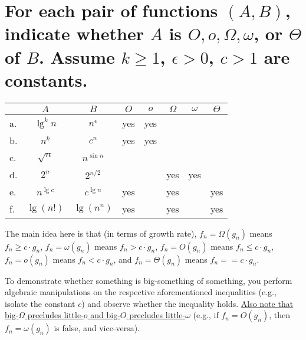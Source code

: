 \section[Problem 5]{For each pair of functions $(A, B)$, indicate whether $A$ is $O, o, \Omega, \omega$, or $\Theta$ of $B$. Assume $k \geq 1$, $\epsilon > 0$, $c > 1$ are constants.}
\begin{center}
	\begin{tabular}{lcc|c|c|c|c|c}
		& $A$ & $B$ & $O$ & $o$ & $\Omega$ & $\omega$ & $\Theta$ \\ \hline
		a. & $\lg^k n$ & $n^{\epsilon}$ & yes & yes &  &  &  \\ \hline
		b. & $n^k$ & $c^n$				& yes & yes &  &  &  \\ \hline
		c. & $\sqrt{n}$ & $n^{\sin n}$	&  &  &  &  &  \\ \hline
		d. & $2^n$ & $2^{n/2}$			&  &  & yes & yes &  \\ \hline
		e. & $n^{\lg c}$ & $c^{\lg n}$	& yes &  & yes &  & yes \\ \hline
		f. & $\lg(n!)$ & $\lg(n^n)$		& yes &  & yes &  & yes 
	\end{tabular}
\end{center}

The main idea here is that (in terms of growth rate), 
$f_n = \Omega(g_n)$ means	$f_n \geq c \cdot g_n$,
$f_n = \omega(g_n)$ means	$f_n > c \cdot g_n$,
$f_n = O(g_n)$ means		$f_n \leq c \cdot g_n$,
$f_n = o(g_n)$ means		$f_n < c \cdot g_n$, and
$f_n = \Theta(g_n)$ means	$f_n == c \cdot g_n$. 

To demonstrate whether something is big-something of something, you perform algebraic manipulations on the respective aforementioned inequalities (e.g., isolate the constant $c$) and observe whether the inequality holds. \ul{Also note that big-$\Omega$ precludes little-$o$ and big-$O$ precludes little-$\omega$} (e.g., if $f_n = O(g_n)$, then $f_n = \omega(g_n)$ is false, and vice-versa).
